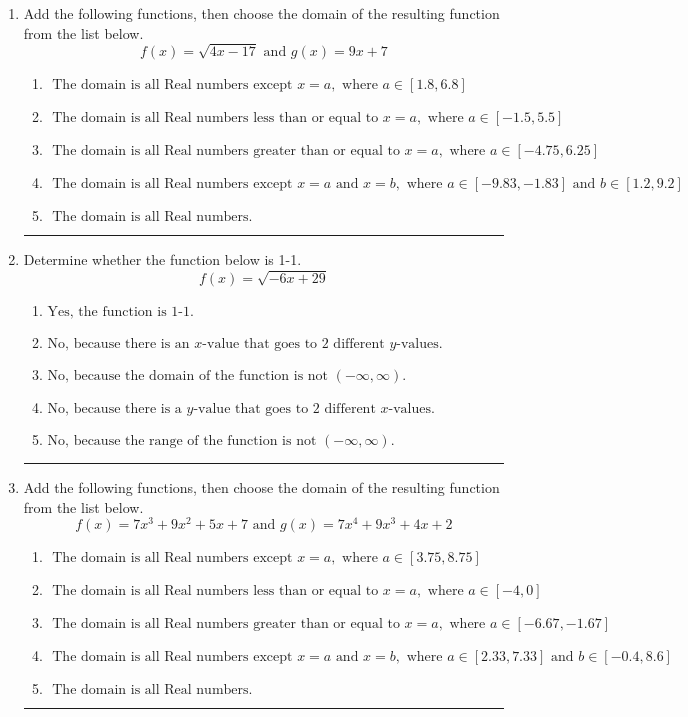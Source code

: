 \documentclass[14pt]{extbook}
\newcommand{\litem}[1]{\item#1\hspace*{-1cm}\rule{\textwidth}{0.4pt}}
\begin{document}
\begin{enumerate}
{\begin{enumerate}[label=\Alph*.]
\end{enumerate} }
\litem{
Add the following functions, then choose the domain of the resulting function from the list below.\[ f(x) = \sqrt{4x-17}  \text{ and } g(x) = 9x + 7 \]\begin{enumerate}[label=\Alph*.]
\item \( \text{ The domain is all Real numbers except } x = a, \text{ where } a \in [1.8, 6.8] \)
\item \( \text{ The domain is all Real numbers less than or equal to } x = a, \text{ where } a \in [-1.5, 5.5] \)
\item \( \text{ The domain is all Real numbers greater than or equal to } x = a, \text{ where } a \in [-4.75, 6.25] \)
\item \( \text{ The domain is all Real numbers except } x = a \text{ and } x = b, \text{ where } a \in [-9.83, -1.83] \text{ and } b \in [1.2, 9.2] \)
\item \( \text{ The domain is all Real numbers. } \)

\end{enumerate} }
\litem{
Determine whether the function below is 1-1.\[ f(x) = \sqrt{-6 x + 29} \]\begin{enumerate}[label=\Alph*.]
\item \( \text{Yes, the function is 1-1.} \)
\item \( \text{No, because there is an $x$-value that goes to 2 different $y$-values.} \)
\item \( \text{No, because the domain of the function is not $(-\infty, \infty)$.} \)
\item \( \text{No, because there is a $y$-value that goes to 2 different $x$-values.} \)
\item \( \text{No, because the range of the function is not $(-\infty, \infty)$.} \)

\end{enumerate} }
\litem{
Add the following functions, then choose the domain of the resulting function from the list below.\[ f(x) = 7x^{3} +9 x^{2} +5 x + 7 \text{ and } g(x) = 7x^{4} +9 x^{3} +4 x + 2 \]\begin{enumerate}[label=\Alph*.]
\item \( \text{ The domain is all Real numbers except } x = a, \text{ where } a \in [3.75, 8.75] \)
\item \( \text{ The domain is all Real numbers less than or equal to } x = a, \text{ where } a \in [-4, 0] \)
\item \( \text{ The domain is all Real numbers greater than or equal to } x = a, \text{ where } a \in [-6.67, -1.67] \)
\item \( \text{ The domain is all Real numbers except } x = a \text{ and } x = b, \text{ where } a \in [2.33, 7.33] \text{ and } b \in [-0.4, 8.6] \)
\item \( \text{ The domain is all Real numbers. } \)

\end{enumerate} }
\end{enumerate}
\end{document}
